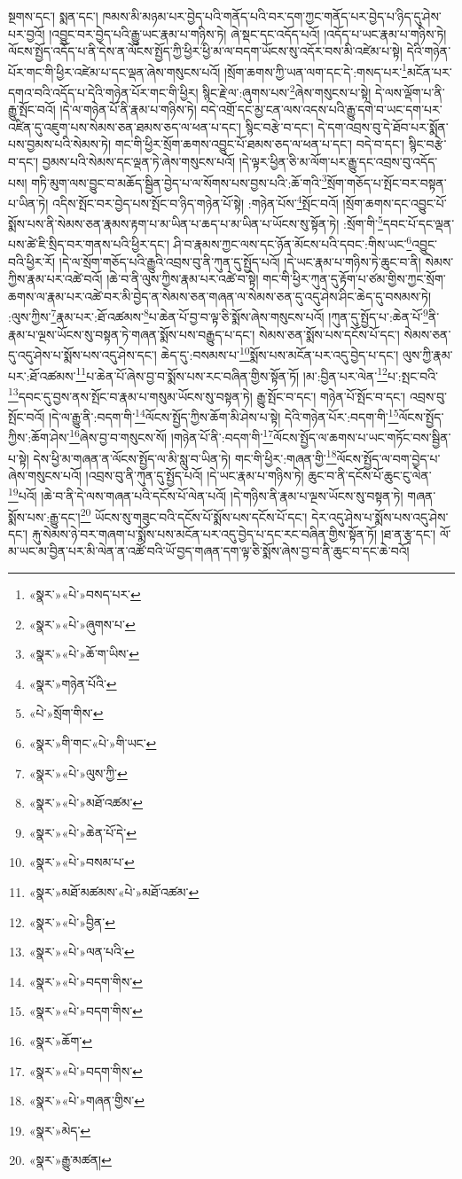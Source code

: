 སྔགས་དང་། སྨན་དང་། ཁམས་མི་མཉམ་པར་བྱེད་པའི་གནོད་པའི་བར་དག་ཀྱང་གནོད་པར་བྱེད་པ་ཉིད་དུ་ཤེས་པར་བྱའོ། །འབྱུང་བར་བྱེད་པའི་རྒྱུ་ཡང་རྣམ་པ་གཉིས་ཏེ། ཞེ་སྡང་དང་འདོད་པའོ། །འདོད་པ་ཡང་རྣམ་པ་གཉིས་ཏེ། ལོངས་སྤྱོད་འདོད་པ་ནི་དེས་ན་ལོངས་སྤྱོད་ཀྱི་ཕྱིར་ཕྱི་མ་ལ་བདག་ཡོངས་སུ་འདོར་བས་མི་འཛེམ་པ་སྟེ། དེའི་གཉེན་པོར་གང་གི་ཕྱིར་འཛེམ་པ་དང་ལྡན་ཞེས་གསུངས་པའོ། །སྲོག་ཆགས་ཀྱི་ཡན་ལག་དང་དེ་:གསད་པར་\footnote{«སྣར་»«པེ་»བསད་པར་}མངོན་པར་དགའ་བའི་འདོད་པ་དེའི་གཉེན་པོར་གང་གི་ཕྱིར། སྙིང་རྗེ་ལ་:ཞུགས་པས་\footnote{«སྣར་»«པེ་»ཞུགས་པ་}ཞེས་གསུངས་པ་སྟེ། དེ་ལས་ལྡོག་པ་ནི་རྒྱུ་སྤོང་བའོ། །དེ་ལ་གཉེན་པོ་ནི་རྣམ་པ་གཉིས་ཏེ། བདེ་འགྲོ་དང་མྱ་ངན་ལས་འདས་པའི་རྒྱུ་དགེ་བ་ཡང་དག་པར་འཛིན་དུ་འཇུག་པས་སེམས་ཅན་ཐམས་ཅད་ལ་ཕན་པ་དང་། སྙིང་བརྩེ་བ་དང་། དེ་དག་འབྲས་བུ་དེ་ཐོབ་པར་སྨོན་པས་བྱམས་པའི་སེམས་ཏེ། གང་གི་ཕྱིར་སྲོག་ཆགས་འབྱུང་པོ་ཐམས་ཅད་ལ་ཕན་པ་དང་། བདེ་བ་དང་། སྙིང་བརྩེ་བ་དང་། བྱམས་པའི་སེམས་དང་ལྡན་ཏེ་ཞེས་གསུངས་པའོ། །དེ་ལྟར་ཕྱིན་ཅི་མ་ལོག་པར་རྒྱུ་དང་འབྲས་བུ་འདོད་པས། གཏི་མུག་ལས་བྱུང་བ་མཆོད་སྦྱིན་བྱེད་པ་ལ་སོགས་པས་བྱས་པའི་:ཆོ་གའི་\footnote{«སྣར་»«པེ་»ཆོ་ག་ཡིས་}སྲོག་གཅོད་པ་སྤོང་བར་བསྟན་པ་ཡིན་ཏེ། འདིས་སྤོང་བར་བྱེད་པས་སྤོང་བ་ཉིད་གཉེན་པོ་སྟེ། :གཉེན་པོས་\footnote{«སྣར་»གཉེན་པོའི་}སྤོང་བའོ། །སྲོག་ཆགས་དང་འབྱུང་པོ་སྨོས་པས་ནི་སེམས་ཅན་རྣམས་རྟག་པ་མ་ཡིན་པ་ཆད་པ་མ་ཡིན་པ་ཡོངས་སུ་སྟོན་ཏེ། :སྲོག་གི་\footnote{«པེ་»སྲོག་གིས་}དབང་པོ་དང་ལྡན་པས་ཚེ་ཇི་སྲིད་བར་གནས་པའི་ཕྱིར་དང་། ཤི་བ་རྣམས་ཀྱང་ལས་དང་ཉོན་མོངས་པའི་དབང་:གིས་ཡང་\footnote{«སྣར་»གི་གང་«པེ་»གི་ཡང་}འབྱུང་བའི་ཕྱིར་རོ། །དེ་ལ་སྲོག་གཅོད་པའི་རྒྱུའི་འབྲས་བུ་ནི་ཀུན་དུ་སྤྱོད་པའོ། །དེ་ཡང་རྣམ་པ་གཉིས་ཏེ་ཆུང་བ་ནི། སེམས་ཀྱིས་རྣམ་པར་འཚེ་བའོ། །ཆེ་བ་ནི་ལུས་ཀྱིས་རྣམ་པར་འཚེ་བ་སྟེ། གང་གི་ཕྱིར་ཀུན་དུ་རྟོག་པ་ཙམ་གྱིས་ཀྱང་སྲོག་ཆགས་ལ་རྣམ་པར་འཚེ་བར་མི་བྱེད་ན་སེམས་ཅན་གཞན་ལ་སེམས་ཅན་དུ་འདུ་ཤེས་ཤིང་ཆེད་དུ་བསམས་ཏེ། :ལུས་ཀྱིས་\footnote{«སྣར་»«པེ་»ལུས་ཀྱི་}རྣམ་པར་:ཐོ་འཚམས་\footnote{«སྣར་»«པེ་»མཐོ་འཚམ་}པ་ཆེན་པོ་བྱ་བ་ལྟ་ཅི་སྨོས་ཞེས་གསུངས་པའོ། །ཀུན་དུ་སྤྱོད་པ་:ཆེན་པོ་\footnote{«སྣར་»«པེ་»ཆེན་པོ་དེ་}ནི་རྣམ་པ་ལྔས་ཡོངས་སུ་བསྟན་ཏེ་གཞན་སྨོས་པས་བརྒྱུད་པ་དང་། སེམས་ཅན་སྨོས་པས་དངོས་པོ་དང་། སེམས་ཅན་དུ་འདུ་ཤེས་པ་སྨོས་པས་འདུ་ཤེས་དང་། ཆེད་དུ་:བསམས་པ་\footnote{«སྣར་»«པེ་»བསམ་པ་}སྨོས་པས་མངོན་པར་འདུ་བྱེད་པ་དང་། ལུས་ཀྱི་རྣམ་པར་:ཐོ་འཚམས་\footnote{«སྣར་»མཐོ་མཚམས་«པེ་»མཐོ་འཚམ་}པ་ཆེན་པོ་ཞེས་བྱ་བ་སྨོས་པས་རང་བཞིན་གྱིས་སྟོན་ཏོ། །མ་:བྱིན་པར་ལེན་\footnote{«སྣར་»«པེ་»བྱིན་}པ་:སྤང་བའི་\footnote{«སྣར་»«པེ་»ལན་པའི་}དབང་དུ་བྱས་ནས་སྤོང་བ་རྣམ་པ་གསུམ་ཡོངས་སུ་བསྟན་ཏེ། རྒྱུ་སྤོང་བ་དང་། གཉེན་པོ་སྤོང་བ་དང་། འབྲས་བུ་སྤོང་བའོ། །དེ་ལ་རྒྱུ་ནི་:བདག་གི་\footnote{«སྣར་»«པེ་»བདག་གིས་}ལོངས་སྤྱོད་ཀྱིས་ཆོག་མི་ཤེས་པ་སྟེ། དེའི་གཉེན་པོར་:བདག་གི་\footnote{«སྣར་»«པེ་»བདག་གིས་}ལོངས་སྤྱོད་ཀྱིས་:ཆོག་ཤེས་\footnote{«སྣར་»ཆོག་}ཞེས་བྱ་བ་གསུངས་སོ། །གཉེན་པོ་ནི་:བདག་གི་\footnote{«སྣར་»«པེ་»བདག་གིས་}ལོངས་སྤྱོད་ལ་ཆགས་པ་ཡང་གཏོང་བས་སྦྱིན་པ་སྟེ། དེས་ཕྱི་མ་གཞན་ན་ལོངས་སྤྱོད་ལ་མི་སླུ་བ་ཡིན་ཏེ། གང་གི་ཕྱིར་:གཞན་གྱི་\footnote{«སྣར་»«པེ་»གཞན་གྱིས་}ལོངས་སྤྱོད་ལ་བག་བྱེད་པ་ཞེས་གསུངས་པའོ། །འབྲས་བུ་ནི་ཀུན་དུ་སྤྱོད་པའོ། །དེ་ཡང་རྣམ་པ་གཉིས་ཏེ། ཆུང་བ་ནི་དངོས་པོ་ཆུང་ངུ་ལེན་\footnote{«སྣར་»མེད་}པའོ། །ཆེ་བ་ནི་དེ་ལས་གཞན་པའི་དངོས་པོ་ལེན་པའོ། །དེ་གཉིས་ནི་རྣམ་པ་ལྔས་ཡོངས་སུ་བསྟན་ཏེ། གཞན་སྨོས་པས་:རྒྱུ་དང་།\footnote{«སྣར་»རྒྱུ་མཚན།} ཡོངས་སུ་གཟུང་བའི་དངོས་པོ་སྨོས་པས་དངོས་པོ་དང་། དེར་འདུ་ཤེས་པ་སྨོས་པས་འདུ་ཤེས་དང་། རྐུ་སེམས་ཉེ་བར་གཞག་པ་སྨོས་པས་མངོན་པར་འདུ་བྱེད་པ་དང་རང་བཞིན་གྱིས་སྟོན་ཏོ། །ཐ་ན་རྩྭ་དང་། ལོ་མ་ཡང་མ་བྱིན་པར་མི་ལེན་ན་འཚོ་བའི་ཡོ་བྱད་གཞན་དག་ལྟ་ཅི་སྨོས་ཞེས་བྱ་བ་ནི་ཆུང་བ་དང་ཆེ་བའོ། 